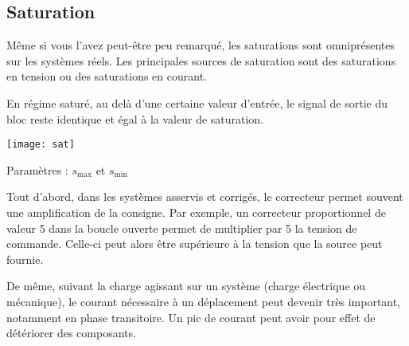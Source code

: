 \subsection{Saturation}

\noindent \begin{minipage}[c]{.54\linewidth}
\indent Même si vous l'avez peut-être peu remarqué, les saturations sont omniprésentes sur les systèmes réels. Les principales sources de saturation sont des saturations en tension ou des saturations en courant. 

En régime saturé, au delà d'une certaine valeur d'entrée, le signal de sortie du bloc reste identique et égal à la valeur de saturation.

\end{minipage}
\hfill
\begin{minipage}[c]{.18\linewidth}
\begin{center}
\texttt{[image: sat]}

Paramètres : $s_{\text{max}}$ et $s_{\text{min}}$
\end{center}
\end{minipage}
\hfill
\begin{minipage}[c]{.22\linewidth}
\begin{center}
\end{center}
\end{minipage}

\vspace{.2cm}

Tout d'abord, dans les systèmes asservis et corrigés, le correcteur permet souvent une amplification de la consigne. Par exemple, un correcteur proportionnel de valeur 5 dans la boucle ouverte permet de multiplier par 5 la tension de commande. Celle-ci peut alors être supérieure à la tension que la source peut fournie.

De même, suivant la charge agissant sur un système (charge électrique ou mécanique), le courant nécessaire à un déplacement peut devenir très important, notamment en phase transitoire. Un pic de courant peut avoir pour effet de détériorer des composants.


